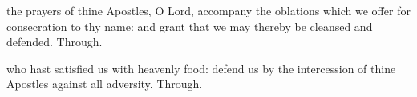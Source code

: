 
\vspace{-0.2\baselineskip}

\secret

\vspace{-0.1\baselineskip}

 the prayers of thine Apostles, O Lord, accompany the oblations which we offer for consecration to thy name: and grant that we may thereby be cleansed and defended. Through.


\vspace{-0.2\baselineskip}

\postcommunion

\vspace{-0.1\baselineskip}

 who hast satisfied us with heavenly food: defend us by the intercession of thine Apostles against all adversity. Through.



